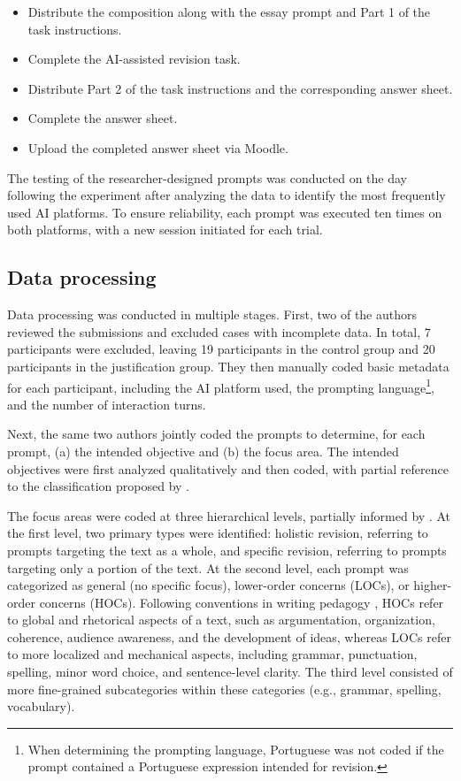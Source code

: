 \documentclass[english]{textolivre}
\begin{document}
\begin{itemize}
\item Distribute the composition along with the essay prompt and Part 1 of the task instructions.
\item Complete the AI-assisted revision task.
\item Distribute Part 2 of the task instructions and the corresponding answer sheet.
\item Complete the answer sheet.
\item Upload the completed answer sheet via Moodle.
\end{itemize}

The testing of the researcher-designed prompts was conducted on the day following the experiment after analyzing the data to identify the most frequently used AI platforms. To ensure reliability, each prompt was executed ten times on both platforms, with a new session initiated for each trial.

\subsection{Data processing}\label{3.4}

Data processing was conducted in multiple stages. First, two of the authors reviewed the submissions and excluded cases with incomplete data. In total, 7 participants were excluded, leaving 19 participants in the control group and 20 participants in the justification group. They then manually coded basic metadata for each participant, including the AI platform used, the prompting language\footnote{When determining the prompting language, Portuguese was not coded if the prompt contained a Portuguese expression intended for revision.}, and the number of interaction turns. 

Next, the same two authors jointly coded the prompts to determine, for each prompt, (a) the intended objective and (b) the focus area. The intended objectives were first analyzed qualitatively and then coded, with partial reference to the classification proposed by \textcite{guo2023resist}.

The focus areas were coded at three hierarchical levels, partially informed by \textcite{KOLTOVSKAIA2024}. At the first level, two primary types were identified: holistic revision, referring to prompts targeting the text as a whole, and specific revision, referring to prompts targeting only a portion of the text. At the second level, each prompt was categorized as general (no specific focus), lower-order concerns (LOCs), or higher-order concerns (HOCs). Following conventions in writing pedagogy \cite{reigstad1984training}, HOCs refer to global and rhetorical aspects of a text, such as argumentation, organization, coherence, audience awareness, and the development of ideas, whereas LOCs refer to more localized and mechanical aspects, including grammar, punctuation, spelling, minor word choice, and sentence-level clarity. The third level consisted of more fine-grained subcategories within these categories (e.g., grammar, spelling, vocabulary).
\end{document}
